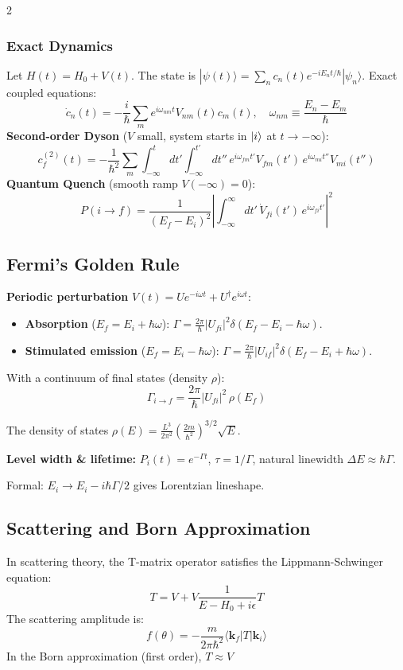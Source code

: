 \documentclass[9pt,a4paper]{article} %
\begin{document}
\begin{multicols}{2}
\subsubsection{Exact Dynamics}
Let $H(t) = H_0 + V(t)$. The state is $|\psi(t)\rangle = \sum_n c_n(t) e^{-iE_n t / \hbar} |\psi_n\rangle$.
Exact coupled equations:
\begin{equation*}
    \dot{c}_n(t) = -\frac{i}{\hbar} \sum_m e^{i\omega_{nm}t} V_{nm}(t) c_m(t), \quad \omega_{nm} \equiv \frac{E_n - E_m}{\hbar}
\end{equation*}
\textbf{Second-order Dyson} ($V$ small, system starts in $\ket{i}$ at $t\to-\infty$):
\begin{equation*}
    c_f^{(2)}(t) = -\frac{1}{\hbar^2} \sum_m \int_{-\infty}^{t}\!\!dt' \int_{-\infty}^{t'}\!\!dt''\, e^{i\omega_{fm}t'} V_{fm}(t')\, e^{i\omega_{mi}t''} V_{mi}(t'')
\end{equation*}
\textbf{Quantum Quench} (smooth ramp $V(-\infty)=0$):
\begin{equation*}
    P(i \to f) = \frac{1}{(E_f - E_i)^2} \left| \int_{-\infty}^{\infty}\!\! dt'\, \dot{V}_{fi}(t')\, e^{i\omega_{fi}t'} \right|^2
\end{equation*}
\subsection{Fermi's Golden Rule}
\textbf{Periodic perturbation} $V(t)=Ue^{-i\omega t}+U^\dagger e^{i\omega t}$:
\begin{itemize}
\item \textbf{Absorption} ($E_f=E_i+\hbar\omega$):
$\Gamma=\frac{2\pi}{\hbar}|U_{fi}|^2\delta(E_f-E_i-\hbar\omega)$.
\item \textbf{Stimulated emission} ($E_f=E_i-\hbar\omega$):
$\Gamma=\frac{2\pi}{\hbar}|U_{if}|^2\delta(E_f-E_i+\hbar\omega)$.
\end{itemize}
With a continuum of final states (density $\rho$):
\[
\boxed{\Gamma_{i\to f}=\frac{2\pi}{\hbar}|U_{fi}|^2\,\rho(E_f)}
\]

The density of states $\rho(E) = \frac{L^3}{2\pi^2} \left( \frac{2m}{\hbar^2} \right)^{3/2} \sqrt{E}$.

\textbf{Level width \& lifetime:}
$P_i(t)=e^{-\Gamma t}$, $\tau=1/\Gamma$, natural linewidth $\Delta E\approx\hbar\Gamma$.

Formal: $E_i\to E_i-i\hbar\Gamma/2$ gives Lorentzian lineshape.

\subsection{Scattering and Born Approximation}
In scattering theory, the T-matrix operator satisfies the Lippmann-Schwinger equation:
\[
T = V + V \frac{1}{E - H_0 + i\epsilon} T
\]
The scattering amplitude is:
\[
f(\theta) = -\frac{m}{2\pi \hbar^2} \langle \mathbf{k}_f | T | \mathbf{k}_i \rangle
\]
In the Born approximation (first order), $T \approx V$

\end{multicols}
\end{document}
